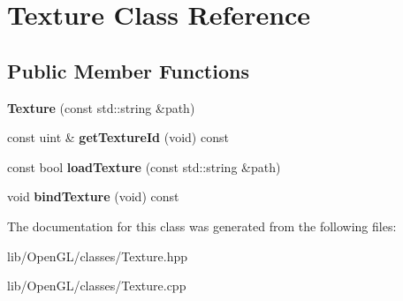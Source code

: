 \hypertarget{class_texture}{}\section{Texture Class Reference}
\label{class_texture}
\subsection*{Public Member Functions}
\begin{DoxyCompactItemize}
\item 
\mbox{\label{class_texture_a4cd45e8898c02b5a5c790a479233124b}} 
{\bfseries Texture} (const std\+::string \&path)
\item 
\mbox{\label{class_texture_ad25b3ba440143db990376651423aa6da}} 
const uint \& {\bfseries get\+Texture\+Id} (void) const
\item 
\mbox{\label{class_texture_a7da06a9a7eb132c4d0dd3ab27ed5e7b1}} 
const bool {\bfseries load\+Texture} (const std\+::string \&path)
\item 
\mbox{\label{class_texture_a81a4d9ab416ccc078c489536a16e0d12}} 
void {\bfseries bind\+Texture} (void) const
\end{DoxyCompactItemize}


The documentation for this class was generated from the following files\+:\begin{DoxyCompactItemize}
\item 
lib/\+Open\+G\+L/classes/Texture.\+hpp\item 
lib/\+Open\+G\+L/classes/Texture.\+cpp\end{DoxyCompactItemize}
